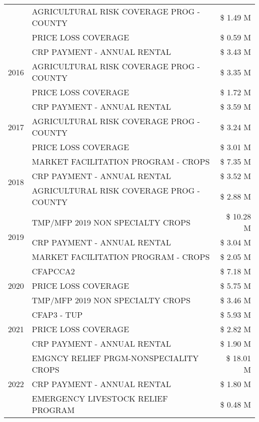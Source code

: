 \begin{tabular}{llr}
 & AGRICULTURAL RISK COVERAGE PROG - COUNTY & \$ 1.49 M \\
 & PRICE LOSS COVERAGE & \$ 0.59 M \\
\cline{1-3}
\multirow[t]{3}{*}{2016} & CRP PAYMENT - ANNUAL RENTAL & \$ 3.43 M \\
 & AGRICULTURAL RISK COVERAGE PROG - COUNTY & \$ 3.35 M \\
 & PRICE LOSS COVERAGE & \$ 1.72 M \\
\cline{1-3}
\multirow[t]{3}{*}{2017} & CRP PAYMENT - ANNUAL RENTAL & \$ 3.59 M \\
 & AGRICULTURAL RISK COVERAGE PROG - COUNTY & \$ 3.24 M \\
 & PRICE LOSS COVERAGE & \$ 3.01 M \\
\cline{1-3}
\multirow[t]{3}{*}{2018} & MARKET FACILITATION PROGRAM - CROPS & \$ 7.35 M \\
 & CRP PAYMENT - ANNUAL RENTAL & \$ 3.52 M \\
 & AGRICULTURAL RISK COVERAGE PROG - COUNTY & \$ 2.88 M \\
\cline{1-3}
\multirow[t]{3}{*}{2019} & TMP/MFP 2019 NON SPECIALTY CROPS & \$ 10.28 M \\
 & CRP PAYMENT - ANNUAL RENTAL & \$ 3.04 M \\
 & MARKET FACILITATION PROGRAM - CROPS & \$ 2.05 M \\
\cline{1-3}
\multirow[t]{3}{*}{2020} & CFAPCCA2 & \$ 7.18 M \\
 & PRICE LOSS COVERAGE & \$ 5.75 M \\
 & TMP/MFP 2019 NON SPECIALTY CROPS & \$ 3.46 M \\
\cline{1-3}
\multirow[t]{3}{*}{2021} & CFAP3 - TUP & \$ 5.93 M \\
 & PRICE LOSS COVERAGE & \$ 2.82 M \\
 & CRP PAYMENT - ANNUAL RENTAL & \$ 1.90 M \\
\cline{1-3}
\multirow[t]{3}{*}{2022} & EMGNCY RELIEF PRGM-NONSPECIALITY CROPS & \$ 18.01 M \\
 & CRP PAYMENT - ANNUAL RENTAL & \$ 1.80 M \\
 & EMERGENCY LIVESTOCK RELIEF PROGRAM & \$ 0.48 M \\
\cline{1-3}
\bottomrule
\end{tabular}
